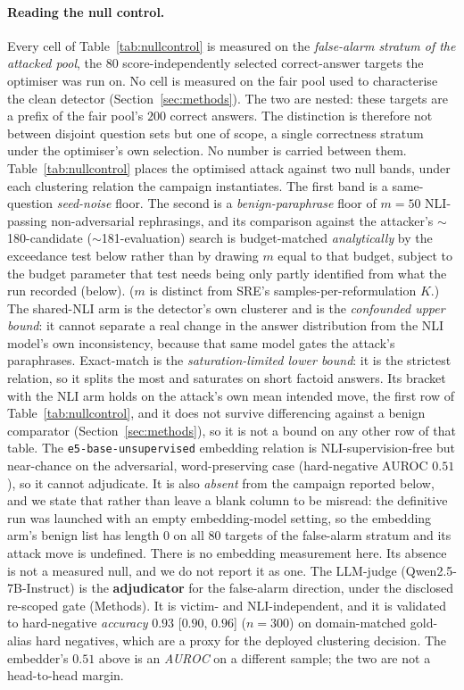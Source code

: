 \paragraph{Reading the null control.}
Every cell of Table~\ref{tab:nullcontrol} is measured on the \emph{false-alarm stratum of the
attacked pool}, the $80$ score-independently selected correct-answer targets the optimiser was
run on. No cell is measured on the fair pool used to characterise the clean detector
(Section~\ref{sec:methods}). The two are nested: these targets are a prefix of the fair pool's
$200$ correct answers. The distinction is therefore not between disjoint question sets but one
of scope, a single correctness stratum under the optimiser's own selection. No number is
carried between them.
Table~\ref{tab:nullcontrol} places the optimised attack against two null bands, under each
clustering relation the campaign instantiates. The first band is a same-question
\emph{seed-noise} floor. The second is a \emph{benign-paraphrase} floor of $m{=}50$
NLI-passing non-adversarial rephrasings, and its comparison against the attacker's
$\sim$180-candidate ($\sim$181-evaluation) search is budget-matched \emph{analytically} by
the exceedance test below rather than by drawing $m$ equal to
that budget, subject to the budget parameter that test needs being only partly identified
from what the run recorded (below). ($m$ is
distinct from SRE's samples-per-reformulation $K$.) The
shared-NLI arm is the detector's own clusterer and is the \emph{confounded upper bound}:
it cannot separate a real change in the answer distribution from the NLI model's own
inconsistency, because that same model gates the attack's paraphrases. Exact-match is the
\emph{saturation-limited lower bound}: it is the strictest relation, so it splits the most
and saturates on short factoid answers. Its bracket with the NLI arm holds on the attack's
own mean intended move, the first row of Table~\ref{tab:nullcontrol}, and it does not survive
differencing against a benign comparator (Section~\ref{sec:methods}), so it is not a bound on
any other row of that table. The
\texttt{e5-base-unsupervised} embedding relation is NLI-supervision-free but near-chance
on the adversarial, word-preserving case (hard-negative AUROC $0.51$), so it cannot
adjudicate. It is also \emph{absent} from the campaign reported below, and we state that
rather than leave a blank column to be misread: the definitive run was launched with an
empty embedding-model setting, so the embedding arm's benign list has length $0$ on all
$80$ targets of the false-alarm stratum and its attack move is undefined. There is no
embedding measurement here. Its absence is not a measured null, and we do not report it as
one. The LLM-judge (Qwen2.5-7B-Instruct) is the \textbf{adjudicator} for the false-alarm
direction, under the disclosed re-scoped gate (Methods). It is victim- and NLI-independent,
and it is validated to hard-negative \emph{accuracy} $0.93$ [$0.90$, $0.96$] ($n{=}300$) on
domain-matched gold-alias hard
negatives, which are a proxy for the deployed clustering decision. The embedder's $0.51$
above is an \emph{AUROC} on a different sample; the two are not a head-to-head margin.

